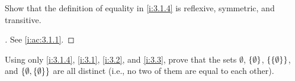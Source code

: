 \exercisesection

\begin{ex}\label{i:ex:3.1.1}
  Show that the definition of equality in \cref{i:3.1.4} is reflexive, symmetric, and transitive.
\end{ex}

\begin{proof}[]
  See \cref{i:ac:3.1.1}.
\end{proof}

\begin{ex}\label{i:ex:3.1.2}
  Using only \cref{i:3.1.4}, \cref{i:3.1}, \cref{i:3.2}, and \cref{i:3.3}, prove that the sets \(\emptyset\), \(\left\lbrace\emptyset\right\rbrace\), \(\left\lbrace\left\lbrace\emptyset\right\rbrace\right\rbrace\), and \(\left\lbrace\emptyset, \left\lbrace\emptyset\right\rbrace\right\rbrace\) are all distinct
  (i.e., no two of them are equal to each other).
\end{ex}

